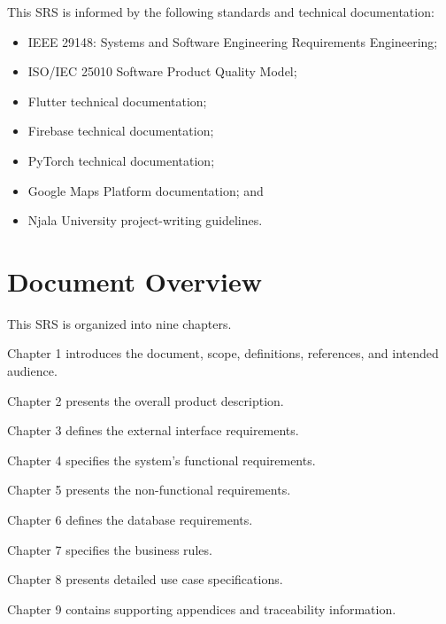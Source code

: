 This SRS is informed by the following standards and technical
documentation:

\begin{itemize}

\item IEEE 29148: Systems and Software Engineering Requirements
Engineering;

\item ISO/IEC 25010 Software Product Quality Model;

\item Flutter technical documentation;

\item Firebase technical documentation;

\item PyTorch technical documentation;

\item Google Maps Platform documentation; and

\item Njala University project-writing guidelines.

\end{itemize}

\section{Document Overview}
\label{sec:document-overview}

This SRS is organized into nine chapters.

Chapter 1 introduces the document, scope, definitions, references, and
intended audience.

Chapter 2 presents the overall product description.

Chapter 3 defines the external interface requirements.

Chapter 4 specifies the system's functional requirements.

Chapter 5 presents the non-functional requirements.

Chapter 6 defines the database requirements.

Chapter 7 specifies the business rules.

Chapter 8 presents detailed use case specifications.

Chapter 9 contains supporting appendices and traceability information.

